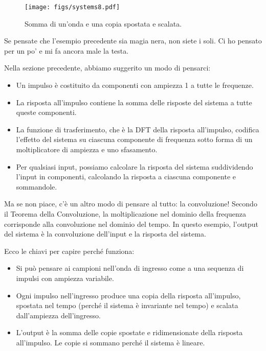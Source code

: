 \documentclass[12pt,a4paper]{book}
\begin{document}
\begin{figure} 

\centerline{\texttt{[image: figs/systems8.pdf]}} \caption{Somma di un'onda e una copia spostata e scalata.} \label{fig.systems8} \end{figure} 

Se pensate che l'esempio precedente sia magia nera, non siete i soli. Ci ho pensato per un po' e mi fa ancora male la testa.

Nella sezione precedente, abbiamo suggerito un modo di pensarci:

\begin{itemize} 

\item Un impulso è costituito da componenti con ampiezza 1 a tutte le frequenze.

\item La risposta all'impulso contiene la somma delle risposte del sistema a tutte queste componenti.

\item La funzione di trasferimento, che è la DFT della risposta all'impulso, codifica l'effetto del sistema su ciascuna componente di frequenza sotto forma di un moltiplicatore di ampiezza e uno sfasamento.

\item Per qualsiasi input, possiamo calcolare la risposta del sistema suddividendo l'input in componenti, calcolando la risposta a ciascuna componente e sommandole.

\end{itemize} 

Ma se non piace, c'è un altro modo di pensare al tutto: la convoluzione! Secondo il Teorema della Convoluzione, la moltiplicazione nel dominio della frequenza corrisponde alla convoluzione nel dominio del tempo. In questo esempio, l'output del sistema è la convoluzione dell'input e la risposta del sistema.

Ecco le chiavi per capire perché funziona:

\begin{itemize} 

\item Si può pensare ai campioni nell'onda di ingresso come a una sequenza di impulsi con ampiezza variabile.

\item Ogni impulso nell'ingresso produce una copia della risposta all'impulso, spostata nel tempo (perché il sistema è invariante nel tempo) e scalata dall'ampiezza dell'ingresso.

\item L'output è la somma delle copie spostate e ridimensionate della risposta all'impulso. Le copie si sommano perché il sistema è lineare.

\end{itemize} 
\end{document}
